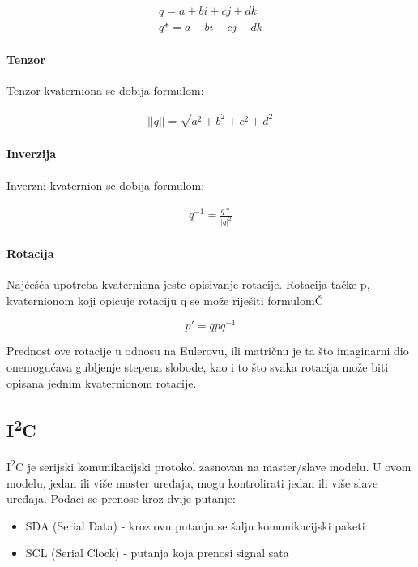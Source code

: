 \documentclass[../Document.tex]{subfiles}
\begin{document}
\begin{align*}
    q=a + bi + cj + dk \\
    q*=a - bi - cj - dk
\end{align*}

\paragraph{Tenzor}
Tenzor kvaterniona se dobija formulom:

\begin{align*}
    ||q||=\sqrt{a^2 + b^2 + c^2 + d^2}
\end{align*}

\paragraph{Inverzija}
Inverzni kvaternion se dobija formulom:

\begin{align*}
    q^{-1}=\frac{q*}{|q|^2}
\end{align*}

\paragraph{Rotacija}
Najćešća upotreba kvaterniona jeste opisivanje rotacije. Rotacija tačke p, kvaternionom koji opicuje rotaciju q se može riješiti formulomČ

$$p'=qpq^{-1}$$

\noindent Prednost ove rotacije u odnosu na Eulerovu, ili matričnu je ta što imaginarni dio onemogućava gubljenje stepena slobode, kao i to što svaka rotacija može biti opisana jednim kvaternionom rotacije.

\newcommand{\itc}{I\textsuperscript{2}C}\label{itc}
\subsection{\itc}
{\itc} je serijski komunikacijski protokol zasnovan na master/slave modelu. U ovom modelu, jedan ili više master uređaja, mogu kontrolirati jedan ili više slave uređaja. Podaci se prenose kroz dvije putanje:

\begin{itemize}
    \item SDA (Serial Data) - kroz ovu putanju se šalju komunikacijski paketi
    \item SCL (Serial Clock) - putanja koja prenosi signal sata
\end{itemize}
\end{document}
